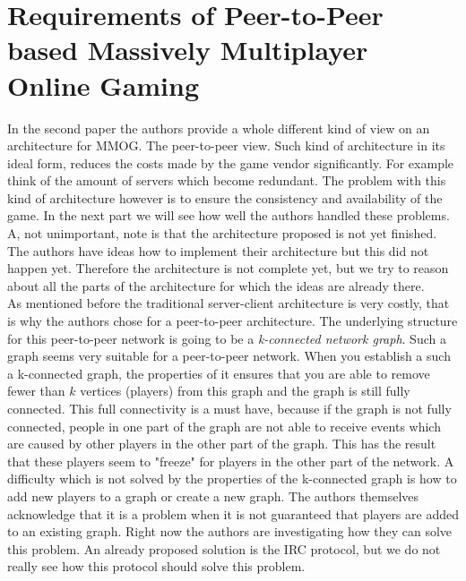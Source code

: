 \section*{Requirements of Peer-to-Peer based Massively Multiplayer Online Gaming}
In the second paper the authors \cite{peer} provide a whole different kind of view on an architecture for MMOG. The peer-to-peer view. Such kind of architecture in its ideal form, reduces the costs made by the game vendor significantly. For example think of the amount of servers which become redundant. The problem with this kind of architecture however is to ensure the consistency and availability of the game. In the next part we will see how well the authors handled these problems. A, not unimportant, note is that the architecture proposed is not yet finished. The authors have ideas how to implement their architecture but this did not happen yet. Therefore the architecture is not complete yet, but we try to reason about all the parts of the architecture for which the ideas are already there.\\
\indent As mentioned before the traditional server-client architecture is very costly, that is why the authors chose for a peer-to-peer architecture. The underlying structure for this peer-to-peer network is going to be a \emph{k-connected network graph}. Such a graph seems very suitable for a peer-to-peer network. When you establish a such a k-connected graph, the properties of it ensures that you are able to remove fewer than $k$ vertices (players) from this graph and the graph is still fully connected. This full connectivity is a must have, because if the graph is not fully connected, people in one part of the graph are not able to receive events which are caused by other players in the other part of the graph. This has the result that these players seem to "freeze" for players in the other part of the network. A difficulty which is not solved by the properties of the k-connected graph is how to add new players to a graph or create a new graph. The authors themselves acknowledge that it is a problem when it is not guaranteed that players are added to an existing graph. Right now the authors are investigating how they can solve this problem. An already proposed solution is the IRC protocol, but we do not really see how this protocol should solve this problem.\\

